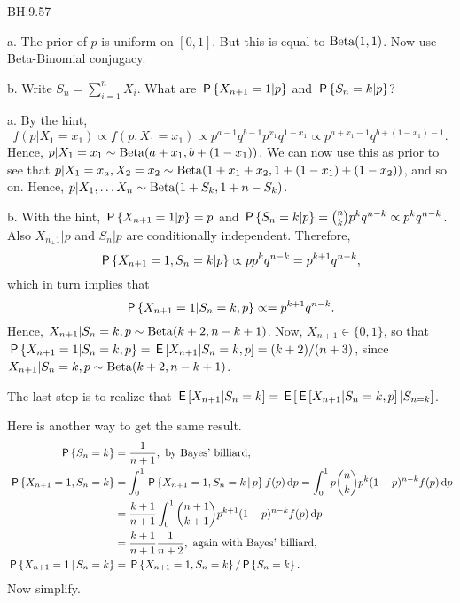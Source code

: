 \setcounter{theorem}{56}
\begin{exercise}
BH.9.57
\begin{hint}
a. The prior of $p$ is uniform on $[0,1]$. But this is equal to $\Beta{1,1}$. Now use  Beta-Binomial conjugacy.

b. Write $S_n=\sum_{i=1}^nX_{i}$. What are $\P{X_{n+1}=1|p}$ and $\P{S_n=k|p}$?
\end{hint}
\begin{solution}
a. By  the hint,
\begin{equation*}
f(p|X_1=x_{1}) \propto f(p, X_1=x_{1}) \propto
p^{a-1} q^{b-1} p^{x_1}q^{1-x_1}
\propto p^{a+x_1-1} q^{b+(1-x_{1})-1}.
\end{equation*}
Hence, $p|X_1=x_1 \sim \Beta{a+x_1, b+(1-x_{1})}$. We can now use this as prior to see that  $p|X_1=x_{a}, X_{2}=x_{2} \sim \Beta{1+x_1+x_2, 1+ (1-x_1) + (1-x_2)}$, and so on. Hence, $p|X_{1}, \ldots X_{n} \sim \Beta{1+S_k, 1+n-S_{k}}$.

b. With the hint, $\P{X_{n+1}=1|p} = p$ and $\P{S_n=k|p} ={n \choose k} p^{k}q^{n-k} \propto p^{k}q^{n-k}$. Also $X_{n_+1}|p$ and $S_n|p$ are conditionally independent.
Therefore,
\begin{equation*}
\P{X_{n+1}=1, S_n=k | p} \propto p p^kq^{n-k} = p^{k+1} q^{n-k},
\end{equation*}
which in turn implies that
\begin{equation*}
\P{X_{n+1}=1| S_n=k, p} \propto = p^{k+1} q^{n-k}.
\end{equation*}
Hence, $X_{n+1}| S_n=k, p \sim \Beta{k+2, n-k+1}$.
Now, $X_{n+1}\in \{0, 1\}$, so that $\P{X_{n+1}=1| S_n=k, p} = \E{X_{n+1}| S_n=k, p} = (k+2)/(n+3)$, since $X_{n+1}| S_n=k, p \sim \Beta{k+2, n-k+1}$.

The last step is to realize that $\E{X_{n+1}|S_{n}=k} = \E{\E{X_{n+1}|S_{n}=k, p}|S_{n=k}}$.

Here is another way to get the same result.
\begin{align*}
\P{S_n=k} &= \frac 1 {n+1},\text{ by Bayes' billiard}, \\
\P{X_{n+1}=1,S_n=k} &=  \int_0^1 \P{X_{n+1}=1,S_n=k\given p} f(p) \d p
= \int_0^1 p {n \choose k} p^{k} (1-p)^{n-k} f(p) \d p \\
&= \frac{k+1}{n+1}\int_0^1  {n+1 \choose k+1} p^{k+1} (1-p)^{n-k} f(p) \d p \\
&= \frac{k+1}{n+1} \frac 1 {n+2}, \text{ again with Bayes' billiard}, \\
\P{X_{n+1}=1 \given S_n=k} &= \P{X_{n+1}=1,S_n=k}/\P{S_{n}=k}.
\end{align*}
Now simplify.
\end{solution}
\end{exercise}

